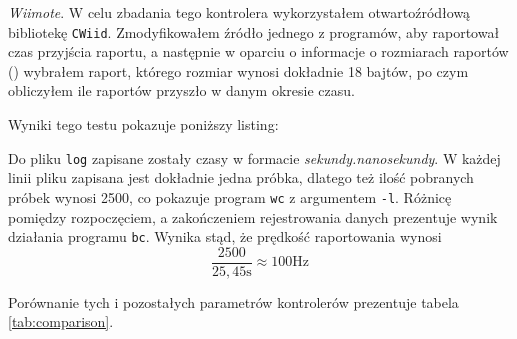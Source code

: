 \textsl{Wiimote}. W celu zbadania tego kontrolera wykorzystałem otwartoźródłową bibliotekę \texttt{CWiid}\citep{CWiid}. Zmodyfikowałem źródło jednego z programów, aby raportował czas przyjścia raportu, a następnie w oparciu o informacje o rozmiarach raportów (\citep{Wiibrew}) wybrałem raport, którego rozmiar wynosi dokładnie 18 bajtów, po czym obliczyłem ile raportów przyszło w danym okresie czasu.

Wyniki tego testu pokazuje poniższy listing:



Do pliku \texttt{log} zapisane zostały czasy w formacie \textit{sekundy.nanosekundy}. W każdej linii pliku zapisana jest dokładnie jedna próbka, dlatego też ilość pobranych próbek wynosi 2500, co pokazuje program \texttt{wc} z argumentem \texttt{-l}. Różnicę pomiędzy rozpoczęciem, a zakończeniem rejestrowania danych prezentuje wynik działania programu \texttt{bc}. Wynika stąd, że prędkość raportowania wynosi
\begin{equation}
 \frac{2500}{25,45\textrm{s}} \approx 100\textrm{Hz}
\end{equation}

Porównanie tych i pozostałych parametrów kontrolerów prezentuje tabela \ref{tab:comparison}.


\begin{table}[b]
  \myfloatalign
\noindent{}
  \caption{Zestawienie funkcjonalności kontrolerów gier}
  \label{tab:comparison}
\end{table}